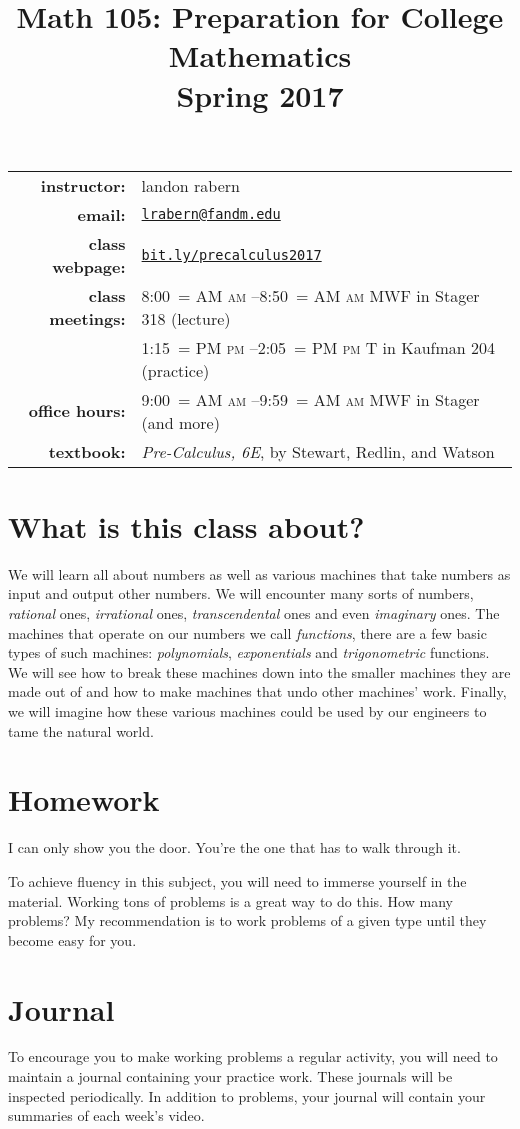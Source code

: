 \documentclass[12pt]{article}
\title{Math 105: Preparation for College Mathematics\\ \bigskip\small{Spring 2017}}
\date{}
\makeatletter
\DeclareRobustCommand{\maybefakesc}[1]{%
  \ifnum\pdfstrcmp{\f@series}{\bfdefault}=\z@
    {\fontsize{\dimexpr0.8\dimexpr\f@size pt\relax}{0}\selectfont\uppercase{#1}}%
  \else
    \textsc{#1}%
  \fi
}
\newcommand\AM{\,\maybefakesc{am}\xspace}
\newcommand\PM{\,\maybefakesc{pm}\xspace}
\makeatother
\begin{document}
\maketitle

\begin{tabular}{r l}
\textbf{instructor:}& landon rabern\\
\textbf{email:}& \href{mailto:lrabern@fandm.edu}{\nolinkurl{lrabern@fandm.edu}}\\
\textbf{class webpage:}& \href{http://bit.ly/precalculus2017}{\nolinkurl{bit.ly/precalculus2017}}\\
\textbf{class meetings:}& 8:00\AM--8:50\AM MWF in Stager 318 (lecture)\\
& 1:15\PM--2:05\PM T in Kaufman 204 (practice)\\
\textbf{office hours:}& 9:00\AM--9:59\AM MWF in Stager (and more)\\
\textbf{textbook:}& \textit{Pre-Calculus, 6E}, by Stewart, Redlin, and Watson\\
\end{tabular}

\section*{What is this class about?}
We will learn all about numbers as well as various machines that take numbers as input and output other numbers.
We will encounter many sorts of numbers, \emph{rational} ones, \emph{irrational} ones, \emph{transcendental} ones and even \emph{imaginary} ones. 
The machines that operate on our numbers we call \emph{functions}, there are a few basic types of such machines: \emph{polynomials}, \emph{exponentials} and \emph{trigonometric} functions.
We will see how to break these machines down into the smaller machines they are made out of and how to make machines that undo other machines' work.  Finally, we will 
imagine how these various machines could be used by our engineers to tame the natural world.
\section*{Homework} 
\epigraph{I can only show you the door. You're the one that has to walk through it.}{}
To achieve fluency in this subject, you will need to immerse yourself in the material.  
Working tons of problems is a great way to do this.  How many problems?  
My recommendation is to work problems of a given type until they become easy for you.
\section*{Journal} 
To encourage you to make working problems a regular activity, you will need to maintain a journal containing your practice work.
These journals will be inspected periodically.  In addition to problems, your journal will contain your summaries of each week's video.
\end{document}

